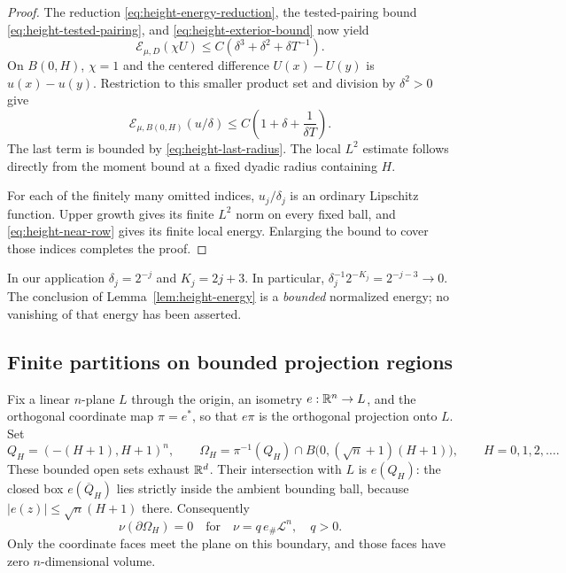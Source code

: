 \begin{proof}
The reduction \eqref{eq:height-energy-reduction}, the tested-pairing bound
\eqref{eq:height-tested-pairing}, and \eqref{eq:height-exterior-bound}
now yield
\begin{equation}
 \mathcal E_{\mu,D}(\chi U)
       \le C(\delta^3+\delta^2+\delta T^{-1}).
 \label{eq:height-unnormalized-energy}
\end{equation}
On $B(0,H)$, $\chi=1$ and the centered difference $U(x)-U(y)$ is
$u(x)-u(y)$.  Restriction to this smaller product set and division by
$\delta^2>0$ give
\begin{equation}
 \mathcal E_{\mu,B(0,H)}(u/\delta)
       \le C\left(1+\delta+\frac{1}{\delta T}\right).
 \label{eq:height-normalized-bound}
\end{equation}
The last term is bounded by \eqref{eq:height-last-radius}.  The local
$L^2$ estimate follows directly from the moment bound at a fixed dyadic
radius containing $H$.

For each of the finitely many omitted indices, $u_j/\delta_j$ is an
ordinary Lipschitz function.  Upper growth gives its finite $L^2$ norm
on every fixed ball, and \eqref{eq:height-near-row} gives its finite local
energy.  Enlarging the bound to cover those indices completes the proof.
\end{proof}

In our application $\delta_j=2^{-j}$ and $K_j=2j+3$.  In particular,
$\delta_j^{-1}2^{-K_j}=2^{-j-3}\to0$.  The conclusion of
Lemma~\ref{lem:height-energy} is a \emph{bounded} normalized energy;
no vanishing of that energy has been asserted.

\subsection{Finite partitions on bounded projection regions}

Fix a linear $n$-plane $L$ through the origin, an isometry
$e:\mathbb R^n\to L$, and the orthogonal coordinate map $\pi=e^*$, so that
$e\pi$ is the orthogonal projection onto $L$.  Set
\begin{equation}
 Q_H=(-(H+1),H+1)^n,
 \qquad
 \Omega_H=\pi^{-1}(Q_H)\cap
 B\bigl(0,(\sqrt n+1)(H+1)\bigr),
 \qquad H=0,1,2,\ldots .
 \label{eq:height-projection-regions}
\end{equation}
These bounded open sets exhaust $\mathbb R^d$.  Their intersection with $L$ is
$e(Q_H)$: the closed box $e(\overline Q_H)$ lies strictly inside the
ambient bounding ball, because $|e(z)|\le\sqrt n(H+1)$ there.  Consequently
\begin{equation}
 \nu(\partial\Omega_H)=0
 \quad\text{for}\quad \nu=q\,e_\#\mathcal L^n,\quad q>0.
 \label{eq:height-region-null-boundary}
\end{equation}
Only the coordinate faces meet the plane on this boundary, and those faces
have zero $n$-dimensional volume.

